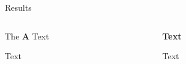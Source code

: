 \documentclass[final]{beamer}
\newlength{\onecolwid}
\newlength{\twocolwid}
\begin{document}
\begin{frame}[t]
\begin{columns}[t]
\begin{column}{\twocolwid}
\begin{block}{Results}
\begin{columns}[t,totalwidth=\twocolwid]
\begin{column}{\onecolwid}
\vspace{2cm}


The \textbf{A} Text


\begin{center}
\begin{figure}
\end{figure}
\end{center}


\vspace{2cm}


Text


\begin{center}
\begin{figure}
\end{figure}
\end{center}




\end{column} %

\begin{column}{\onecolwid} %



\vspace{0.5cm}


\begin{center}
\textbf{Text}
\end{center}


Text


\begin{center}
\begin{figure}
\end{figure}
\end{center}

\vspace{1cm}

\begin{center}
\begin{figure}
\end{figure}
\end{center}




\end{column}
\end{columns}
\end{block}
\end{column}
\end{columns}
\end{frame}
\end{document}
